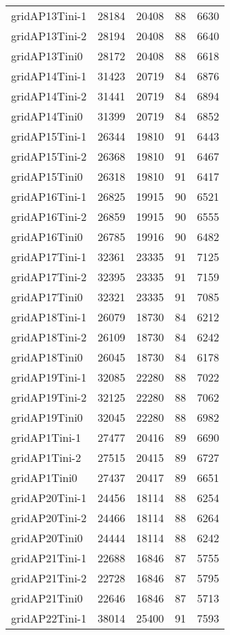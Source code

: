 \begin{longtable}{lrrrr}
gridAP13Tini-1 & 28184 & 20408 & 88 & 6630 \\
gridAP13Tini-2 & 28194 & 20408 & 88 & 6640 \\
gridAP13Tini0 & 28172 & 20408 & 88 & 6618 \\
gridAP14Tini-1 & 31423 & 20719 & 84 & 6876 \\
gridAP14Tini-2 & 31441 & 20719 & 84 & 6894 \\
gridAP14Tini0 & 31399 & 20719 & 84 & 6852 \\
gridAP15Tini-1 & 26344 & 19810 & 91 & 6443 \\
gridAP15Tini-2 & 26368 & 19810 & 91 & 6467 \\
gridAP15Tini0 & 26318 & 19810 & 91 & 6417 \\
gridAP16Tini-1 & 26825 & 19915 & 90 & 6521 \\
gridAP16Tini-2 & 26859 & 19915 & 90 & 6555 \\
gridAP16Tini0 & 26785 & 19916 & 90 & 6482 \\
gridAP17Tini-1 & 32361 & 23335 & 91 & 7125 \\
gridAP17Tini-2 & 32395 & 23335 & 91 & 7159 \\
gridAP17Tini0 & 32321 & 23335 & 91 & 7085 \\
gridAP18Tini-1 & 26079 & 18730 & 84 & 6212 \\
gridAP18Tini-2 & 26109 & 18730 & 84 & 6242 \\
gridAP18Tini0 & 26045 & 18730 & 84 & 6178 \\
gridAP19Tini-1 & 32085 & 22280 & 88 & 7022 \\
gridAP19Tini-2 & 32125 & 22280 & 88 & 7062 \\
gridAP19Tini0 & 32045 & 22280 & 88 & 6982 \\
gridAP1Tini-1 & 27477 & 20416 & 89 & 6690 \\
gridAP1Tini-2 & 27515 & 20415 & 89 & 6727 \\
gridAP1Tini0 & 27437 & 20417 & 89 & 6651 \\
gridAP20Tini-1 & 24456 & 18114 & 88 & 6254 \\
gridAP20Tini-2 & 24466 & 18114 & 88 & 6264 \\
gridAP20Tini0 & 24444 & 18114 & 88 & 6242 \\
gridAP21Tini-1 & 22688 & 16846 & 87 & 5755 \\
gridAP21Tini-2 & 22728 & 16846 & 87 & 5795 \\
gridAP21Tini0 & 22646 & 16846 & 87 & 5713 \\
gridAP22Tini-1 & 38014 & 25400 & 91 & 7593 \\

\end{longtable}
